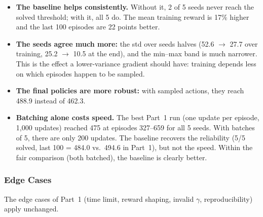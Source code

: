 \begin{itemize}
  \item \textbf{The baseline helps consistently.} Without it, 2 of 5 seeds never reach the solved threshold; with it, all 5 do. The mean training reward is 17\% higher and the last 100 episodes are 22 points better.
  \item \textbf{The seeds agree much more:} the std over seeds halves (52.6 $\to$ 27.7 over training, 25.2 $\to$ 10.5 at the end), and the min--max band is much narrower. This is the effect a lower-variance gradient should have: training depends less on which episodes happen to be sampled.
  \item \textbf{The final policies are more robust:} with sampled actions, they reach 488.9 instead of 462.3.
  \item \textbf{Batching alone costs speed.} The best Part~1 run (one update per episode, 1,000 updates) reached 475 at episodes 327--659 for all 5 seeds. With batches of 5, there are only 200 updates. The baseline recovers the reliability (5/5 solved, last 100 = 484.0 vs.\ 494.6 in Part~1), but not the speed. Within the fair comparison (both batched), the baseline is clearly better.
\end{itemize}

\subsubsection{Edge Cases}

The edge cases of Part~1 (time limit, reward shaping, invalid $\gamma$, reproducibility) apply unchanged.

